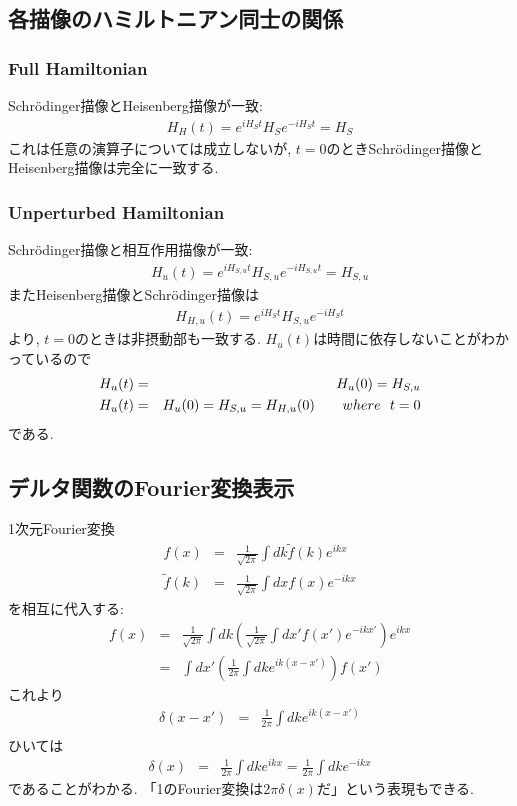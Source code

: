 \documentclass[10.5pt,a4paper]{jreport}
\begin{document}
\subsection{各描像のハミルトニアン同士の関係}
\subsubsection{Full Hamiltonian}
Schr\"odinger描像とHeisenberg描像が一致:
\begin{eqnarray}
  H_H(t) = e^{iH_St}H_Se^{-iH_St} = H_S
\end{eqnarray}
これは任意の演算子については成立しないが, $t = 0$のときSchr\"odinger描像とHeisenberg描像は完全に一致する.
\subsubsection{Unperturbed Hamiltonian}
Schr\"odinger描像と相互作用描像が一致:
\begin{eqnarray}
  H_u(t) = e^{iH_{S, u}t}H_{S, u}e^{-iH_{S, u}t} = H_{S, u}
\end{eqnarray}
またHeisenberg描像とSchr\"odinger描像は
\begin{eqnarray}
  H_{H, u}(t) = e^{iH_St}H_{S, u}e^{-iH_St}
\end{eqnarray}
より, $t = 0$のときは非摂動部も一致する. $H_u(t)$は時間に依存しないことがわかっているので
\begin{eqnarray}
  H_u(t) &=& H_u(0) = H_{S, u}\\
  H_u(t) &=& H_u(0) = H_{S, u} = H_{H, u}(0)\hspace{0.7cm} where\ \ t = 0
\end{eqnarray}
である.
\subsection{デルタ関数のFourier変換表示}
1次元Fourier変換
\begin{eqnarray}
  f(x) &=& \frac{1}{\sqrt{2\pi}}\int dk \tilde{f}(k)e^{ikx}\\
  \tilde{f}(k) &=& \frac{1}{\sqrt{2\pi}}\int dx f(x)e^{-ikx}
\end{eqnarray}
を相互に代入する:
\begin{eqnarray}
  f(x) &=& \frac{1}{\sqrt{2\pi}}\int dk \left(\frac{1}{\sqrt{2\pi}}\int dx' f(x')e^{-ikx'}\right)e^{ikx}\\
  &=& \int dx' \left(\frac{1}{2\pi}\int dk e^{ik(x-x')}\right)f(x')
\end{eqnarray}
これより
\begin{eqnarray}
  \delta(x-x') &=& \frac{1}{2\pi}\int dk e^{ik(x-x')}\\
\end{eqnarray}
ひいては
\begin{eqnarray}
  \delta(x) &=& \frac{1}{2\pi}\int dk e^{ikx} = \frac{1}{2\pi}\int dk e^{-ikx}
\end{eqnarray}
であることがわかる. 「1のFourier変換は$2\pi\delta(x)$だ」という表現もできる. 
\end{document}
